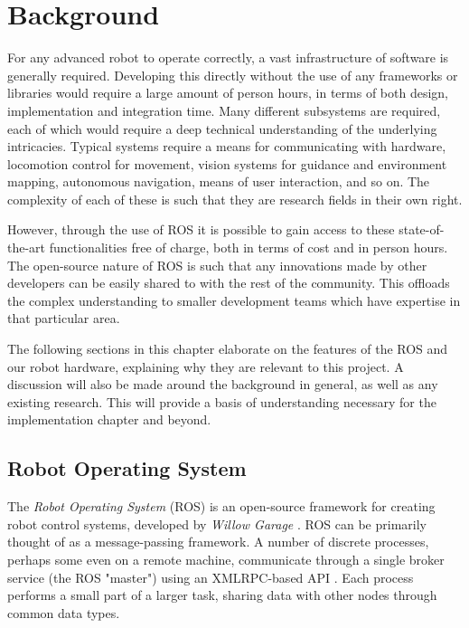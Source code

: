\chapter{Background}
\label{chap:background}

For any advanced robot to operate correctly, a vast infrastructure of software is generally required. Developing this directly without the use of any frameworks or libraries would require a large amount of person hours, in terms of both design, implementation and integration time. Many different subsystems are required, each of which would require a deep technical understanding of the underlying intricacies. Typical systems require a means for communicating with hardware, locomotion control for movement, vision systems for guidance and environment mapping, autonomous navigation, means of user interaction, and so on. The complexity of each of these is such that they are research fields in their own right. 

However, through the use of ROS it is possible to gain access to these state-of-the-art functionalities free of charge, both in terms of cost and in person hours. The open-source nature of ROS is such that any innovations made by other developers can be easily shared to with the rest of the community. This offloads the complex understanding to smaller development teams which have expertise in that particular area.

The following sections in this chapter elaborate on the features of the ROS and our robot hardware, explaining why they are relevant to this project. A discussion will also be made around the background in general, as well as any existing research. This will provide a basis of understanding necessary for the implementation chapter and beyond.


\section{Robot Operating System}

The \emph{Robot Operating System} (ROS) is an open-source framework for creating robot control systems, developed by \emph{Willow Garage} \cite{ros_paper}. ROS can be primarily thought of as a message-passing framework. A number of discrete processes, perhaps some even on a remote machine, communicate through a single broker service (the ROS "master") using an XMLRPC-based API \cite{ros_paper}. Each process performs a small part of a larger task, sharing data with other nodes through common data types.


